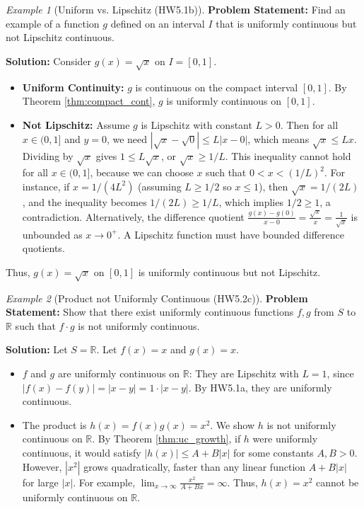 \documentclass{article}
\theoremstyle{definition}
\theoremstyle{plain}
\theoremstyle{remark}
\newtheorem{example}{Example}[section]
\newcommand{\R}{\mathbb{R}}
\begin{document}
\begin{example}[Uniform vs. Lipschitz (HW5.1b)]
\textbf{Problem Statement:} Find an example of a function \(g\) defined on an interval \(I\) that is uniformly continuous but not Lipschitz continuous.

\textbf{Solution:} Consider \(g(x) = \sqrt{x}\) on \(I = [0, 1]\).
\begin{itemize}
    \item \textbf{Uniform Continuity:} \(g\) is continuous on the compact interval \([0, 1]\). By Theorem \ref{thm:compact_cont}, \(g\) is uniformly continuous on \([0, 1]\).
    \item \textbf{Not Lipschitz:} Assume \(g\) is Lipschitz with constant \(L > 0\). Then for all \(x \in (0, 1]\) and \(y=0\), we need \(|\sqrt{x} - \sqrt{0}| \le L |x - 0|\), which means \(\sqrt{x} \le L x\). Dividing by \(\sqrt{x}\) gives \(1 \le L \sqrt{x}\), or \(\sqrt{x} \ge 1/L\). This inequality cannot hold for all \(x \in (0, 1]\), because we can choose \(x\) such that \(0 < x < (1/L)^2\). For instance, if \(x = 1/(4L^2)\) (assuming \(L \ge 1/2\) so \(x \le 1\)), then \(\sqrt{x} = 1/(2L)\), and the inequality becomes \(1/(2L) \ge 1/L\), which implies \(1/2 \ge 1\), a contradiction.
    Alternatively, the difference quotient \(\frac{g(x)-g(0)}{x-0} = \frac{\sqrt{x}}{x} = \frac{1}{\sqrt{x}}\) is unbounded as \(x \to 0^+\). A Lipschitz function must have bounded difference quotients.
\end{itemize}
Thus, \(g(x)=\sqrt{x}\) on \([0,1]\) is uniformly continuous but not Lipschitz.
\end{example}

\begin{example}[Product not Uniformly Continuous (HW5.2c)]
\textbf{Problem Statement:} Show that there exist uniformly continuous functions \(f, g\) from \(S\) to \(\R\) such that \(f \cdot g\) is not uniformly continuous.

\textbf{Solution:} Let \(S = \R\). Let \(f(x) = x\) and \(g(x) = x\).
\begin{itemize}
    \item \(f\) and \(g\) are uniformly continuous on \(\R\): They are Lipschitz with \(L=1\), since \(|f(x)-f(y)| = |x-y| = 1 \cdot |x-y|\). By HW5.1a, they are uniformly continuous.
    \item The product is \(h(x) = f(x)g(x) = x^2\). We show \(h\) is not uniformly continuous on \(\R\). By Theorem \ref{thm:uc_growth}, if \(h\) were uniformly continuous, it would satisfy \(|h(x)| \le A + B|x|\) for some constants \(A, B > 0\). However, \(|x^2|\) grows quadratically, faster than any linear function \(A+B|x|\) for large \(|x|\). For example, \(\lim_{x\to\infty} \frac{x^2}{A+Bx} = \infty\). Thus, \(h(x)=x^2\) cannot be uniformly continuous on \(\R\).
\end{itemize}
\end{example}
\end{document}
